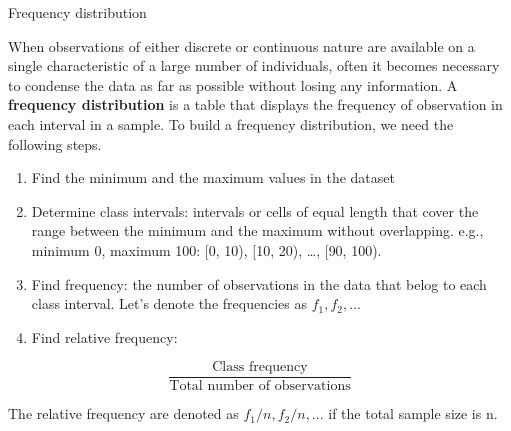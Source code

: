 \documentclass[
  ignorenonframetext,
  aspectratio=169]{beamer}
\providecommand{\tightlist}{%
  \setlength{\itemsep}{0pt}\setlength{\parskip}{0pt}}
\begin{document}
\begin{frame}{Frequency distribution}
\protect\hypertarget{frequency-distribution}{}
\footnotesize

When observations of either discrete or continuous nature are available
on a single characteristic of a large number of individuals, often it
becomes necessary to condense the data as far as possible without losing
any information. A \textbf{frequency distribution} is a table that
displays the frequency of observation in each interval in a sample. To
build a frequency distribution, we need the following steps.

\begin{enumerate}
\tightlist
\item
  Find the minimum and the maximum values in the dataset
\item
  Determine class intervals: intervals or cells of equal length that
  cover the range between the minimum and the maximum without
  overlapping. e.g., minimum 0, maximum 100: {[}0, 10), {[}10, 20),
  \ldots, {[}90, 100).
\item
  Find frequency: the number of observations in the data that belog to
  each class interval. Let's denote the frequencies as \(f_1, f_2, ...\)
\item
  Find relative frequency:
\end{enumerate}

\[
\frac{\textrm{Class frequency}}{\textrm{Total number of observations}}
\]

The relative frequency are denoted as \(f_1/n, f_2/n, ...\) if the total
sample size is n.
\end{frame}
\end{document}

